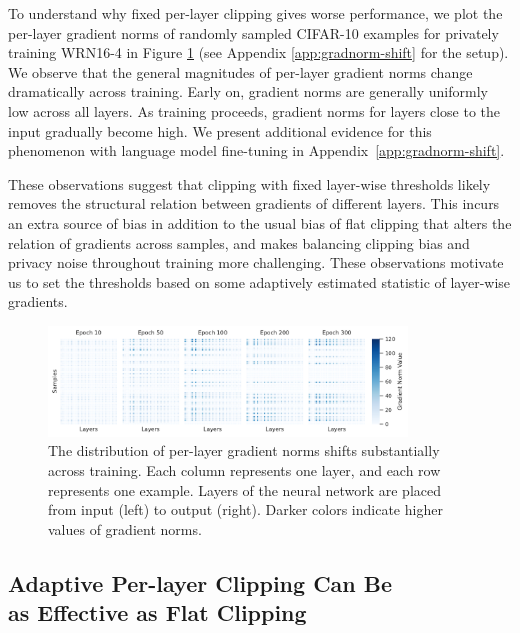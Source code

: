 To understand why fixed per-layer clipping gives worse performance, we plot the per-layer gradient norms of randomly sampled CIFAR-10 examples for privately training WRN16-4 in Figure \ref{fig:grad-norm-cifar10} (see Appendix \ref{app:gradnorm-shift} for the setup). 
We observe that the general magnitudes of per-layer gradient norms change dramatically across training. 
Early on, gradient norms are generally uniformly low across all layers. 
As training proceeds, gradient norms for layers close to the input gradually become high. 
We present additional evidence for this phenomenon with language model fine-tuning in Appendix~\ref{app:gradnorm-shift}. 

These observations suggest that clipping with fixed layer-wise thresholds likely removes the structural relation between gradients of different layers. 
This incurs an extra source of bias in addition to the usual bias of flat clipping that alters the relation of gradients across samples, and makes balancing clipping bias and privacy noise throughout training more challenging. 
These observations motivate us to set the thresholds based on some adaptively estimated statistic of layer-wise gradients. 

\begin{figure}[ht]
\centering
\includegraphics[width=0.85\textwidth]{files/fig/persample_perlayer_norm_cifar.pdf}
\caption{The distribution of per-layer gradient norms shifts substantially across training. Each column represents one layer, and each row represents  one example. 
Layers of the neural network are placed from input (left) to output (right). 
Darker colors indicate higher values of gradient norms. 
}
\label{fig:grad-norm-cifar10}
\end{figure}

\subsection{Adaptive Per-layer Clipping Can Be \\as Effective as Flat Clipping}
\label{sec:adaptive-clipping}

